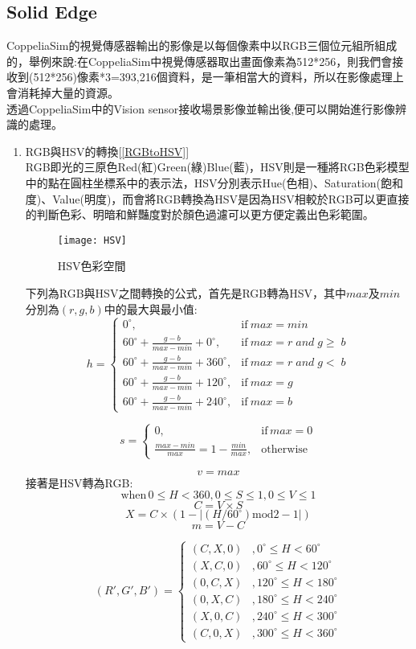 \subsection{Solid Edge}
 CoppeliaSim的視覺傳感器輸出的影像是以每個像素中以RGB三個位元組所組成的，舉例來說:在CoppeliaSim中視覺傳感器取出畫面像素為512*256，則我們會接收到(512*256)像素*3=393,216個資料，是一筆相當大的資料，所以在影像處理上會消耗掉大量的資源。\\

 透過CoppeliaSim中的Vision sensor接收場景影像並輸出後,便可以開始進行影像辨識的處理。\\
\begin{enumerate}
\item RGB與HSV的轉換[\ref{RGBtoHSV}]\\
RGB即光的三原色Red(紅)Green(綠)Blue(藍)，HSV則是一種將RGB色彩模型中的點在圓柱坐標系中的表示法，HSV分別表示Hue(色相)、Saturation(飽和度)、Value(明度)，而會將RGB轉換為HSV是因為HSV相較於RGB可以更直接的判斷色彩、明暗和鮮豔度對於顏色過濾可以更方便定義出色彩範圍。\\
\begin{figure}[hbt!]
\center
\texttt{[image: HSV]}
\caption{\Large HSV色彩空間}
\end{figure}
\newpage
下列為RGB與HSV之間轉換的公式，首先是RGB轉為HSV，其中$max$及$min$分別為$(r,g,b)$中的最大與最小值:
$$h=\left\{\begin{matrix}
0^{\circ}, & \textrm{if}\ max=min\\ 
60^{\circ}+\frac{g-b}{max-min}+0^{\circ},& \textrm{if}\ max=r\;and\;g\geq \;b\\ 
60^{\circ}+\frac{g-b}{max-min}+360^{\circ}, & \textrm{if}\ max=r\;and\;g<  \;b\\ 
60^{\circ}+\frac{g-b}{max-min}+120^{\circ}, & \textrm{if}\ max=g\\ 
60^{\circ}+\frac{g-b}{max-min}+240^{\circ}, & \textrm{if}\ max=b
\end{matrix}\right.$$

$$s=\left\{\begin{matrix}
0, & \textrm{if}\,max=0\\ 
\frac{max-min}{max}=1-\frac{min}{max}, & \textrm{otherwise}
\end{matrix}\right.$$

$$v=max$$
接著是HSV轉為RGB:
$$\textrm{when}\,0\leq H< 360,0\leq S\leq 1,0\leq V\leq 1$$
$$C=V\times S$$
$$X=C\times (1-\left | (H/60^{\circ})\textrm{mod}2-1 \right |)$$
$$m=V-C$$

$$({R}',{G}',{B}')=\left\{\begin{matrix}
(C,X,0)& ,0^{\circ}\leq H< 60^{\circ}\\ 
 (X,C,0)& ,60^{\circ}\leq H< 120^{\circ}\\ 
 (0,C,X)& ,120^{\circ}\leq H< 180^{\circ}\\ 
 (0,X,C)& ,180^{\circ}\leq H< 240^{\circ}\\ 
 (X,0,C)& ,240^{\circ}\leq H< 300^{\circ}\\ 
 (C,0,X)& ,300^{\circ}\leq H< 360^{\circ}
\end{matrix}\right.$$



\end{enumerate}
